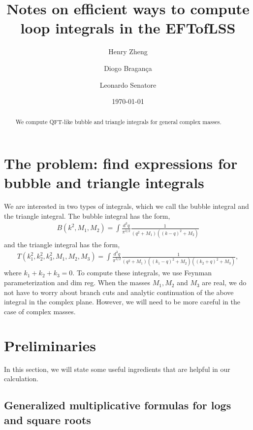 \documentclass[twoside]{article}
\begin{document}
\title{Notes on efficient ways to compute loop integrals in the EFTofLSS}

\author{Henry Zheng \and
	Diogo Bragan\c{c}a \and
	Leonardo Senatore 
}


\date{\today}

\maketitle

\begin{abstract}
We compute QFT-like bubble and triangle integrals for general complex masses.
\end{abstract}

\tableofcontents

\section{The problem: find expressions for bubble and triangle integrals}
We are interested in two types of integrals, which we call the bubble integral and the triangle integral. The bubble integral has the form,
\begin{align}
\label{eq:bubble}
B(k^2,M_1,M_2) =  \int \frac{d^3q}{\pi^{3/2}}\frac{1}{(q^2 + M_1)( (k-q)^2 + M_2)}
\end{align}
and the triangle integral has the form,
\begin{align}
T(k_1^2, k_2^2, k_3^2, M_1, M_2, M_3) =  \int \frac{d^3q}{\pi^{3/2}}\frac{1}{(q^2 + M_1)( (k_1-q)^2 + M_2)( (k_2 + q)^2 + M_3)},
\end{align}
where $k_1 + k_2 + k_3 = 0$.
To compute these integrals, we use Feynman parameterization and dim reg. When the masses $M_1,M_2$ and $M_3$ are real, we do not
have to worry about branch cuts and analytic continuation of the above integral in the complex plane. However, we will need to be more
careful in the case of complex masses. 


\section{Preliminaries}
\label{sec:prelim}

In this section, we will state some useful ingredients that are helpful in our calculation.

\subsection{Generalized multiplicative formulas for logs and square roots}
\end{document}
